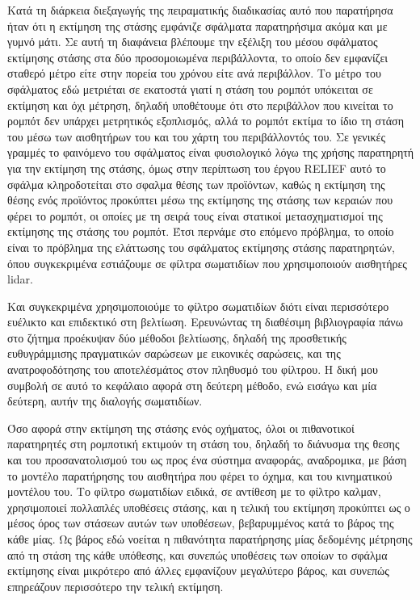 \documentclass[a4paper,10pt]{article}
\begin{document}
Κατά τη διάρκεια διεξαγωγής της πειραματικής διαδικασίας αυτό που παρατήρησα
ήταν ότι η εκτίμηση της στάσης εμφάνιζε σφάλματα παρατηρήσιμα ακόμα και με
γυμνό μάτι. Σε αυτή τη διαφάνεια βλέπουμε την εξέλιξη του μέσου σφάλματος
εκτίμησης στάσης στα δύο προσομοιωμένα περιβάλλοντα, το οποίο δεν εμφανίζει
σταθερό μέτρο είτε στην πορεία του χρόνου είτε ανά περιβάλλον.  Το μέτρο του
σφάλματος εδώ μετριέται σε εκατοστά γιατί η στάση του ρομπότ υπόκειται σε
εκτίμηση και όχι μέτρηση, δηλαδή υποθέτουμε ότι στο περιβάλλον που κινείται το
ρομπότ δεν υπάρχει μετρητικός εξοπλισμός, αλλά το ρομπότ εκτίμα το ίδιο τη
στάση του μέσω των αισθητήρων του και του χάρτη του περιβάλλοντός του. Σε
γενικές γραμμές το φαινόμενο του σφάλματος είναι φυσιολογικό λόγω της χρήσης
παρατηρητή για την εκτίμηση της στάσης, όμως στην περίπτωση του έργου RELIEF
αυτό το σφάλμα κληροδοτείται στο σφαλμα θέσης των προϊόντων, καθώς η εκτίμηση
της θέσης ενός προϊόντος προκύπτει μέσω της εκτίμησης της στάσης των κεραιών
που φέρει το ρομπότ, οι οποίες με τη σειρά τους είναι στατικοί μετασχηματισμοί
της εκτίμησης της στάσης του ρομπότ.  Έτσι περνάμε στο επόμενο πρόβλημα, το
οποίο είναι το πρόβλημα της ελάττωσης του σφάλματος εκτίμησης στάσης
παρατηρητών, όπου συγκεκριμένα εστιάζουμε σε φίλτρα σωματιδίων που
χρησιμοποιούν αισθητήρες lidar.





Και συγκεκριμένα χρησιμοποιούμε το φίλτρο σωματιδίων διότι είναι περισσότερο
ευέλικτο και επιδεκτικό στη βελτίωση. Ερευνώντας τη διαθέσιμη βιβλιογραφία πάνω
στο ζήτημα προέκυψαν δύο μέθοδοι βελτίωσης, δηλαδή της προσθετικής
ευθυγράμμισης πραγματικών σαρώσεων με εικονικές σαρώσεις, και της
ανατροφοδότησης του αποτελέσμάτος στον πληθυσμό του φίλτρου. Η δική μου συμβολή
σε αυτό το κεφάλαιο αφορά στη δεύτερη μέθοδο, ενώ εισάγω και μία δεύτερη, αυτήν
της διαλογής σωματιδίων.

Όσο αφορά στην εκτίμηση της στάσης ενός οχήματος, όλοι οι πιθανοτικοί
παρατηρητές στη ρομποτική εκτιμούν τη στάση του, δηλαδή το διάνυσμα της
θεσης και του προσανατολισμού του ως προς ένα σύστημα αναφοράς, αναδρομικα,
με βάση το μοντέλο παρατήρησης του αισθητήρα που φέρει το όχημα, και του
κινηματικού μοντέλου του. Το φίλτρο σωματιδίων ειδικά, σε αντίθεση με το φίλτρο
καλμαν, χρησιμοποιεί πολλαπλές υποθέσεις στάσης, και η τελική του εκτίμηση
προκύπτει ως ο μέσος όρος των στάσεων αυτών των υποθέσεων, βεβαρυμμένος
κατά το βάρος της κάθε μίας. Ως βάρος εδώ νοείται η πιθανότητα παρατήρησης
μίας δεδομένης μέτρησης από τη στάση της κάθε υπόθεσης, και συνεπώς υποθέσεις
των οποίων το σφάλμα εκτίμησης είναι μικρότερο από άλλες εμφανίζουν μεγαλύτερο
βάρος, και συνεπώς επηρεάζουν περισσότερο την τελική εκτίμηση.
\end{document}
